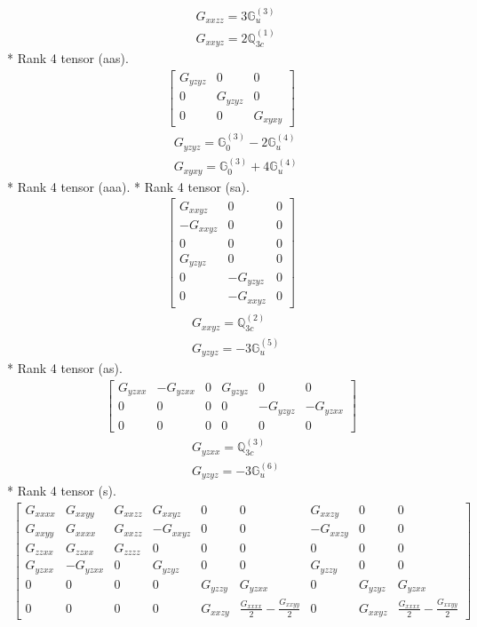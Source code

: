 \documentclass[fleqn,8pt,landscape]{jsarticle}
\begin{document}
\begin{align*}
& G_{xxzz} = 3 \mathbb{G}_{u}^{(3)} \\
& G_{xxyz} = 2 \mathbb{Q}_{3c}^{(1)}
\end{align*}
* Rank 4 tensor (aas).
\begin{align*}
\begin{bmatrix} G_{yzyz} & 0 & 0 \\ 0 & G_{yzyz} & 0 \\ 0 & 0 & G_{xyxy} \end{bmatrix}
\end{align*}
\begin{align*}
& G_{yzyz} = \mathbb{G}_{0}^{(3)} - 2 \mathbb{G}_{u}^{(4)} \\
& G_{xyxy} = \mathbb{G}_{0}^{(3)} + 4 \mathbb{G}_{u}^{(4)}
\end{align*}
* Rank 4 tensor (aaa).
* Rank 4 tensor (sa).
\begin{align*}
\begin{bmatrix} G_{xxyz} & 0 & 0 \\ - G_{xxyz} & 0 & 0 \\ 0 & 0 & 0 \\ G_{yzyz} & 0 & 0 \\ 0 & - G_{yzyz} & 0 \\ 0 & - G_{xxyz} & 0 \end{bmatrix}
\end{align*}
\begin{align*}
& G_{xxyz} = \mathbb{Q}_{3c}^{(2)} \\
& G_{yzyz} = - 3 \mathbb{G}_{u}^{(5)}
\end{align*}
* Rank 4 tensor (as).
\begin{align*}
\begin{bmatrix} G_{yzxx} & - G_{yzxx} & 0 & G_{yzyz} & 0 & 0 \\ 0 & 0 & 0 & 0 & - G_{yzyz} & - G_{yzxx} \\ 0 & 0 & 0 & 0 & 0 & 0 \end{bmatrix}
\end{align*}
\begin{align*}
& G_{yzxx} = \mathbb{Q}_{3c}^{(3)} \\
& G_{yzyz} = - 3 \mathbb{G}_{u}^{(6)}
\end{align*}
* Rank 4 tensor (s).
\begin{align*}
\begin{bmatrix} G_{xxxx} & G_{xxyy} & G_{xxzz} & G_{xxyz} & 0 & 0 & G_{xxzy} & 0 & 0 \\ G_{xxyy} & G_{xxxx} & G_{xxzz} & - G_{xxyz} & 0 & 0 & - G_{xxzy} & 0 & 0 \\ G_{zzxx} & G_{zzxx} & G_{zzzz} & 0 & 0 & 0 & 0 & 0 & 0 \\ G_{yzxx} & - G_{yzxx} & 0 & G_{yzyz} & 0 & 0 & G_{yzzy} & 0 & 0 \\ 0 & 0 & 0 & 0 & G_{yzzy} & G_{yzxx} & 0 & G_{yzyz} & G_{yzxx} \\ 0 & 0 & 0 & 0 & G_{xxzy} & \frac{G_{xxxx}}{2} - \frac{G_{xxyy}}{2} & 0 & G_{xxyz} & \frac{G_{xxxx}}{2} - \frac{G_{xxyy}}{2} \end{bmatrix}
\end{align*}
\end{document}
